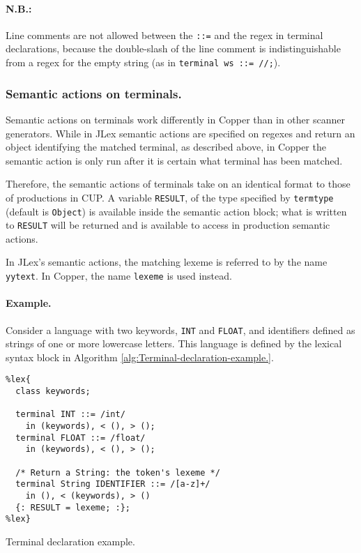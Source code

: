 \documentclass[12pt,english,twoside]{report}
\begin{document}
\paragraph{N.B.:}

Line comments are not allowed between the \texttt{::=} and the regex
in terminal declarations, because the double-slash of the line comment
is indistinguishable from a regex for the empty string (as in
\texttt{terminal ws ::= //;}).


\subsubsection{Semantic actions on terminals.}

Semantic actions on terminals work differently in Copper than in other
scanner generators. While in JLex semantic actions are specified on
regexes and return an object identifying the matched terminal, as
described above, in Copper the semantic action is only run after it
is certain what terminal has been matched.

Therefore, the semantic actions of terminals take on an identical
format to those of productions in CUP. A variable \texttt{RESULT},
of the type specified by \texttt{termtype} (default is \texttt{Object})
is available inside the semantic action block; what is written to
\texttt{RESULT} will be returned and is available to access in production
semantic actions.

In JLex's semantic actions, the matching lexeme is referred to by
the name \texttt{yytext}. In Copper, the name \texttt{lexeme} is used
instead.


\paragraph{Example.}

Consider a language with two keywords, \texttt{INT} and \texttt{FLOAT},
and identifiers defined as strings of one or more lowercase letters.
This language is defined by the lexical syntax block in Algorithm
\ref{alg:Terminal-declaration-example.}.

%
\begin{algorithm}
\begin{verbatim}
%lex{
  class keywords;

  terminal INT ::= /int/
    in (keywords), < (), > ();
  terminal FLOAT ::= /float/
    in (keywords), < (), > ();
  
  /* Return a String: the token's lexeme */
  terminal String IDENTIFIER ::= /[a-z]+/
    in (), < (keywords), > ()
  {: RESULT = lexeme; :};
%lex}
\end{verbatim}

\caption{\label{alg:Terminal-declaration-example.}Terminal declaration example.}
\end{algorithm}
\end{document}
